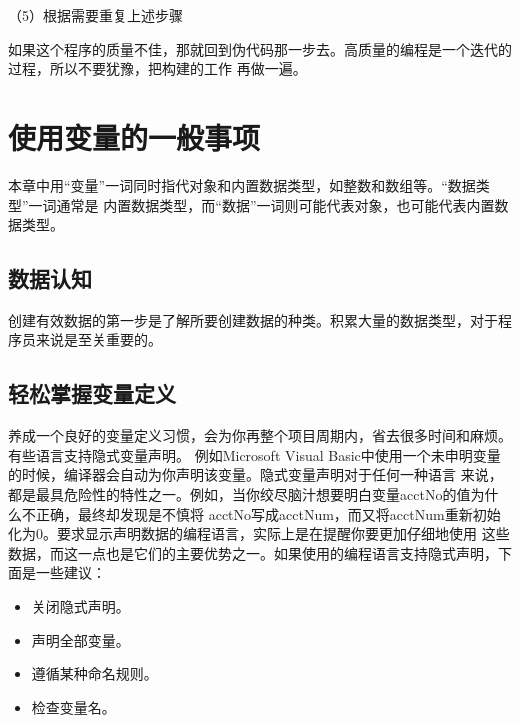 \documentclass{article}
\begin{document}
\par
（5）根据需要重复上述步骤
\par
如果这个程序的质量不佳，那就回到伪代码那一步去。高质量的编程是一个迭代的过程，所以不要犹豫，把构建的工作
再做一遍。

\section{使用变量的一般事项}
本章中用“变量”一词同时指代对象和内置数据类型，如整数和数组等。“数据类型”一词通常是
内置数据类型，而“数据”一词则可能代表对象，也可能代表内置数据类型。
\subsection{数据认知}
创建有效数据的第一步是了解所要创建数据的种类。积累大量的数据类型，对于程序员来说是至关重要的。

\subsection{轻松掌握变量定义}
养成一个良好的变量定义习惯，会为你再整个项目周期内，省去很多时间和麻烦。有些语言支持隐式变量声明。
例如Microsoft Visual Basic中使用一个未申明变量的时候，编译器会自动为你声明该变量。隐式变量声明对于任何一种语言
来说，都是最具危险性的特性之一。例如，当你绞尽脑汁想要明白变量acctNo的值为什么不正确，最终却发现是不慎将
acctNo写成acctNum，而又将acctNum重新初始化为0。要求显示声明数据的编程语言，实际上是在提醒你要更加仔细地使用
这些数据，而这一点也是它们的主要优势之一。如果使用的编程语言支持隐式声明，下面是一些建议：
\begin{itemize}
    \item 关闭隐式声明。
    \item 声明全部变量。
    \item 遵循某种命名规则。
    \item 检查变量名。
\end{itemize}
\end{document}

